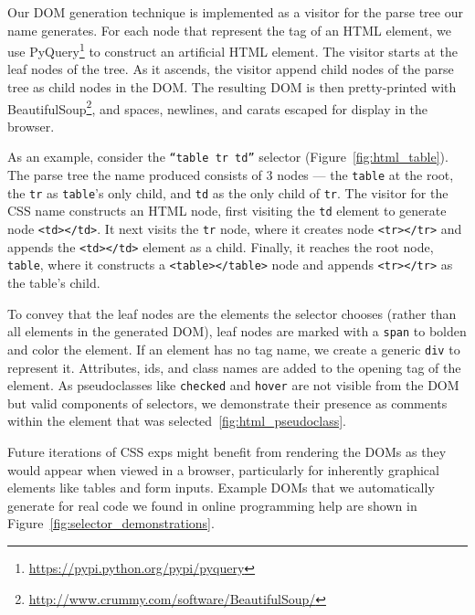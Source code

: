 Our DOM generation technique is implemented as a visitor for the parse tree our \gls{name} generates.
For each node that represent the tag of an HTML element, we use PyQuery\footnote{\url{https://pypi.python.org/pypi/pyquery}} to construct an artificial HTML element.
The visitor starts at the leaf nodes of the tree.
As it ascends, the visitor append child nodes of the parse tree as child nodes in the DOM\@.
The resulting DOM is then pretty-printed with BeautifulSoup\footnote{\url{http://www.crummy.com/software/BeautifulSoup/}}, and spaces, newlines, and carats escaped for display in the browser.

As an example, consider the \texttt{``table tr td''} selector (Figure~\ref{fig:html_table}).
The parse tree the \gls{name} produced consists of 3 nodes --- the \texttt{table} at the root, the \texttt{tr} as \texttt{table}'s only child, and \texttt{td} as the only child of \texttt{tr}.
The visitor for the CSS \gls{name} constructs an HTML node, first visiting the \texttt{td} element to generate node \texttt{<td></td>}.
It next visits the \texttt{tr} node, where it creates node \texttt{<tr></tr>} and appends the \texttt{<td></td>} element as a child.
Finally, it reaches the root node, \texttt{table}, where it constructs a \texttt{<table></table>} node and appends \texttt{<tr></tr>} as the table's child.

To convey that the leaf nodes are the elements the selector chooses (rather than all elements in the generated DOM), leaf nodes are marked with a \texttt{span} to bolden and color the element.
If an element has no tag name, we create a generic \texttt{div} to represent it.
Attributes, ids, and class names are added to the opening tag of the element.
As pseudoclasses like \texttt{checked} and \texttt{hover} are not visible from the DOM but valid components of selectors, we demonstrate their presence as comments within the element that was selected~\ref{fig:html_pseudoclass}.

Future iterations of CSS \glspl{exp} might benefit from rendering the DOMs as they would appear when viewed in a browser, particularly for inherently graphical elements like tables and form inputs.
Example DOMs that we automatically generate for real code we found in online programming help are shown in Figure~\ref{fig:selector_demonstrations}.
\fi

